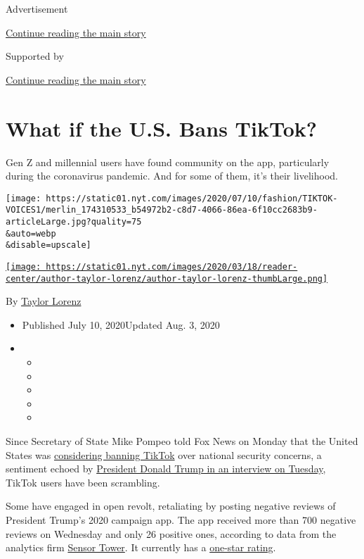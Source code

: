 Advertisement

\protect\hyperlink{after-top}{Continue reading the main story}

Supported by

\protect\hyperlink{after-sponsor}{Continue reading the main story}

\hypertarget{what-if-the-us-bans-tiktok}{%
\section{What if the U.S. Bans
TikTok?}\label{what-if-the-us-bans-tiktok}}

Gen Z and millennial users have found community on the app, particularly
during the coronavirus pandemic. And for some of them, it's their
livelihood.

\texttt{[image: https://static01.nyt.com/images/2020/07/10/fashion/TIKTOK-VOICES1/merlin\_174310533\_b54972b2-c8d7-4066-86ea-6f10cc2683b9-articleLarge.jpg?quality=75\\\&auto=webp\\\&disable=upscale]}

\href{https://www.nytimes.com/by/taylor-lorenz}{\texttt{[image: https://static01.nyt.com/images/2020/03/18/reader-center/author-taylor-lorenz/author-taylor-lorenz-thumbLarge.png]}}

By \href{https://www.nytimes.com/by/taylor-lorenz}{Taylor Lorenz}

\begin{itemize}
\item
  Published July 10, 2020Updated Aug. 3, 2020
\item
  \begin{itemize}
  \item
  \item
  \item
  \item
  \item
  \end{itemize}
\end{itemize}

Since Secretary of State Mike Pompeo told Fox News on Monday that the
United States was
\href{https://www.nytimes.com/2020/08/03/technology/trump-tiktok-microsoft.html}{considering
banning TikTok} over national security concerns, a sentiment echoed by
\href{https://www.fullcourtgreta.com/2020/07/07/gray-televisions-greta-van-susteren-interview-with-president-donald-j-trump/}{President
Donald Trump in an interview on Tuesday}, TikTok users have been
scrambling.

Some have engaged in open revolt, retaliating by posting negative
reviews of President Trump's 2020 campaign app. The app received more
than 700 negative reviews on Wednesday and only 26 positive ones,
according to data from the analytics firm
\href{https://sensortower.com/ios/US/donaldjtrump-for-president/app/official-trump-2020-app/1135325440/overview}{Sensor
Tower}. It currently has a
\href{https://sensortower.com/ios/US/donaldjtrump-for-president/app/official-trump-2020-app/1135325440/overview}{one-star
rating}.

